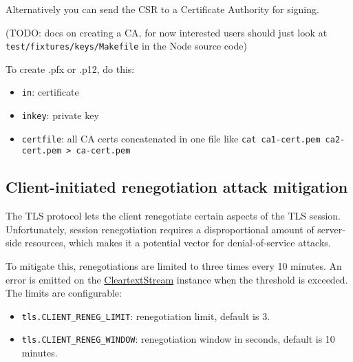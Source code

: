 Alternatively you can send the CSR to a Certificate Authority for
signing.

(TODO: docs on creating a CA, for now interested users should just look
at \texttt{test/fixtures/keys/Makefile} in the Node source code)

To create .pfx or .p12, do this:

\begin{Shaded}
\begin{Highlighting}[]
   \NormalTok{\textbackslash{}}
     
\end{Highlighting}
\end{Shaded}

\begin{itemize}
\item
  \texttt{in}: certificate
\item
  \texttt{inkey}: private key
\item
  \texttt{certfile}: all CA certs concatenated in one file like
  \texttt{cat ca1-cert.pem ca2-cert.pem \textgreater{} ca-cert.pem}
\end{itemize}

\subsection{Client-initiated renegotiation attack mitigation}

The TLS protocol lets the client renegotiate certain aspects of the TLS
session. Unfortunately, session renegotiation requires a disproportional
amount of server-side resources, which makes it a potential vector for
denial-of-service attacks.

To mitigate this, renegotiations are limited to three times every 10
minutes. An error is emitted on the
\hyperref[tls_class_tls_cleartextstream]{CleartextStream} instance
when the threshold is exceeded. The limits are configurable:

\begin{itemize}
\item
  \texttt{tls.CLIENT\_RENEG\_LIMIT}: renegotiation limit, default is 3.
\item
  \texttt{tls.CLIENT\_RENEG\_WINDOW}: renegotiation window in seconds,
  default is 10 minutes.
\end{itemize}

